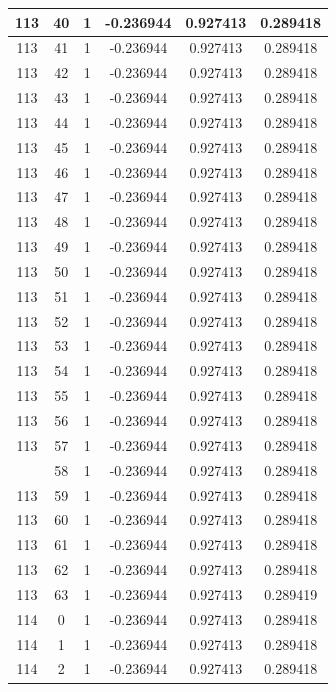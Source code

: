 \documentclass[12pt,a4paper]{article}
\numberwithin{equation}{section}
\numberwithin{figure}{section}
\numberwithin{table}{section}
\begin{document}
\begin{longtable}{|c|c|c|c|c|c|}
113 & 40 & 1 & -0.236944 & 0.927413 & 0.289418 \\ \hline
113 & 41 & 1 & -0.236944 & 0.927413 & 0.289418 \\ \hline
113 & 42 & 1 & -0.236944 & 0.927413 & 0.289418 \\ \hline
113 & 43 & 1 & -0.236944 & 0.927413 & 0.289418 \\ \hline
113 & 44 & 1 & -0.236944 & 0.927413 & 0.289418 \\ \hline
113 & 45 & 1 & -0.236944 & 0.927413 & 0.289418 \\ \hline
113 & 46 & 1 & -0.236944 & 0.927413 & 0.289418 \\ \hline
113 & 47 & 1 & -0.236944 & 0.927413 & 0.289418 \\ \hline
113 & 48 & 1 & -0.236944 & 0.927413 & 0.289418 \\ \hline
113 & 49 & 1 & -0.236944 & 0.927413 & 0.289418 \\ \hline
113 & 50 & 1 & -0.236944 & 0.927413 & 0.289418 \\ \hline
113 & 51 & 1 & -0.236944 & 0.927413 & 0.289418 \\ \hline
113 & 52 & 1 & -0.236944 & 0.927413 & 0.289418 \\ \hline
113 & 53 & 1 & -0.236944 & 0.927413 & 0.289418 \\ \hline
113 & 54 & 1 & -0.236944 & 0.927413 & 0.289418 \\ \hline
113 & 55 & 1 & -0.236944 & 0.927413 & 0.289418 \\ \hline
113 & 56 & 1 & -0.236944 & 0.927413 & 0.289418 \\ \hline
113 & 57 & 1 & -0.236944 & 0.927413 & 0.289418 \\ \hline
\pagebreak
113 & 58 & 1 & -0.236944 & 0.927413 & 0.289418 \\ \hline
113 & 59 & 1 & -0.236944 & 0.927413 & 0.289418 \\ \hline
113 & 60 & 1 & -0.236944 & 0.927413 & 0.289418 \\ \hline
113 & 61 & 1 & -0.236944 & 0.927413 & 0.289418 \\ \hline
113 & 62 & 1 & -0.236944 & 0.927413 & 0.289418 \\ \hline
113 & 63 & 1 & -0.236944 & 0.927413 & 0.289419 \\ \hline
114 & 0 & 1 & -0.236944 & 0.927413 & 0.289418 \\ \hline
114 & 1 & 1 & -0.236944 & 0.927413 & 0.289418 \\ \hline
114 & 2 & 1 & -0.236944 & 0.927413 & 0.289418 \\ \hline

\end{longtable}
\end{document}
